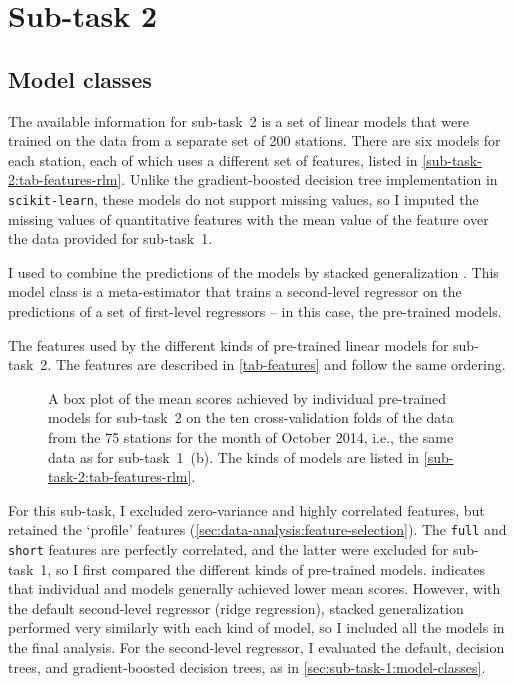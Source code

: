 
\section{Sub-task 2}
\label{sec:sub-task-2}

\subsection{Model classes}
\label{sec:sub-task-2:model-classes}

The available information for sub-task~2 is a set of linear models that were trained on
the data from a separate set of 200 stations.
There are six models for each station, each of which uses a different set of features,
listed in \cref{sub-task-2:tab-features-rlm}.
Unlike the gradient-boosted decision tree implementation in \texttt{scikit-learn},
these models do not support missing values, so I imputed the missing values of
quantitative features with the mean value of the feature over the data provided for
sub-task~1.

I used  to combine the predictions of the models
by stacked generalization \parencite{Wolpert1992}.
This model class is a meta-estimator that trains a second-level regressor on the
predictions of a set of first-level regressors -- in this case, the pre-trained models.

\begin{table}[!ht]
	\centering
	
	\caption{
		The features used by the different kinds of pre-trained linear models for sub-task~2.
		The features are described in \cref{tab-features} and follow the same ordering.
	}
	\label{sub-task-2:tab-features-rlm}
\end{table}

\begin{figure}
	\centering
	
	\caption{
		A box plot of the mean scores achieved by individual pre-trained models for
		sub-task~2 on the ten cross-validation folds of the data from the 75 stations for
		the month of October 2014, i.e., the same data as for sub-task~1~(b).
		The kinds of models are listed in \cref{sub-task-2:tab-features-rlm}.
	}
	\label{sub-task-2:fig-box-plot}
\end{figure}

For this sub-task, I excluded zero-variance and highly correlated features, but
retained the `profile' features (\cref{sec:data-analysis:feature-selection}).
The \texttt{full} and \texttt{short} features are perfectly correlated, and the latter
were excluded for sub-task~1, so I first compared the different kinds of pre-trained
models.
 indicates that individual \rlmshort{} and \rlmshorttemp{} models
generally achieved lower mean scores.
However, with the default second-level regressor (ridge regression), stacked
generalization performed very similarly with each kind of model, so I included all the
models in the final analysis.
For the second-level regressor, I evaluated the default, decision trees, and
gradient-boosted decision trees, as in \cref{sec:sub-task-1:model-classes}.

